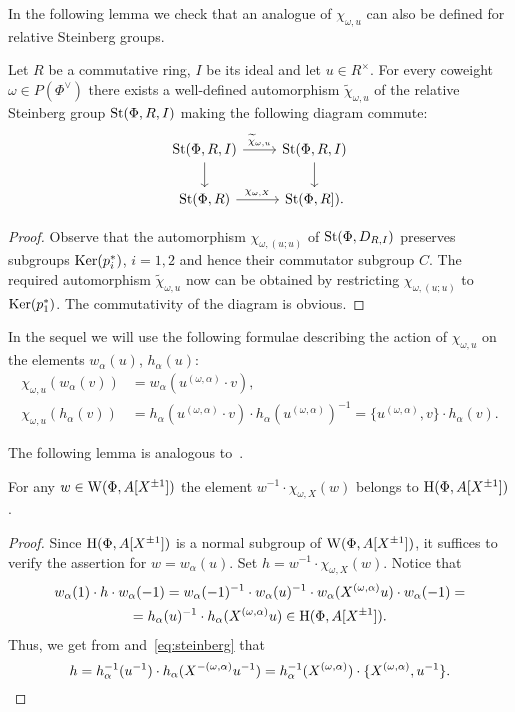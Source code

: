 In the following lemma we check that an analogue of $\chi_{\omega, u}$ can also be defined for relative Steinberg groups.
\begin{lemma} \label{lem:relative-chi}
Let $R$ be a commutative ring, $I$ be its ideal and let $u \in R^\times$.
For every coweight $\omega \in P(\Phi^\vee)$ there exists a well-defined automorphism $\widetilde{\chi}_{\omega, u}$ of the relative Steinberg group $\operatorname{St}(\Phi, R, I)$ making the following diagram commute:
\[\begin{tikzcd} \St(\Phi, R, I) \ar[r, "\widetilde{\chi}_{\omega, u}"] \ar[d] & \St(\Phi, R, I) \ar[d] \\
                 \St(\Phi, R) \ar[r, "\chi_{\omega, X}"] & \St(\Phi, R]). \end{tikzcd}\]
\end{lemma}
\begin{proof}
    Observe that the automorphism $\chi_{\omega, (u; u)}$ of $\operatorname{St}(\Phi, D_{R, I})$ preserves subgroups
     $\operatorname{Ker}(p_i^*)$, $i=1, 2$ and hence their commutator subgroup $C$.
    The required automorphism $\widetilde{\chi}_{\omega, u}$ now can be obtained by restricting $\chi_{\omega, (u; u)}$ to $\operatorname{Ker}(p_1^*)$.
    The commutativity of the diagram is obvious.
\end{proof}

In the sequel we will use the following formulae describing the action of $\chi_{\omega, u}$ on the elements $w_\alpha(u)$, $h_\alpha(u)$:
\begin{align}
    \label{eq:chi-w} \chi_{\omega, u}\left(w_\alpha(v)\right) &= w_\alpha(u^{(\omega, \alpha)} \cdot v), \\
    \label{eq:chi-h} \chi_{\omega, u} (h_\alpha(v)) &= h_\alpha(u^{(\omega, \alpha)} \cdot v) \cdot h_\alpha(u^{(\omega, \alpha)})^{-1} = \{u^{(\omega, \alpha)}, v\} \cdot h_\alpha(v).
\end{align}

The following lemma is analogous to~\cite[Lemma~3.1(c)]{Tu83}.
\begin{lemma} \label{lem:winv-chiw}
For any $w \in \operatorname{W}(\Phi, A[X^{\pm 1}])$ the element $w^{-1} \cdot \chi_{\omega, X}(w)$ belongs to $\operatorname{H}(\Phi, A[X^{\pm 1}])$.
\end{lemma}
\begin{proof}
Since $\operatorname{H}(\Phi, A[X^{\pm 1}])$ is a normal subgroup of $\operatorname{W}(\Phi, A[X^{\pm 1}])$, it suffices to verify the assertion for $w = w_\alpha(u)$.
Set $h = w^{-1} \cdot \chi_{\omega, X}(w)$.
Notice that
\begin{multline*} w_\alpha(1) \cdot h\cdot  w_\alpha(-1) = w_\alpha(-1)^{-1} \cdot w_\alpha(u)^{-1} \cdot w_{\alpha}(X^{(\omega, \alpha)} u) \cdot w_\alpha(-1) = \\
= h_\alpha(u)^{-1} \cdot h_\alpha(X^{(\omega, \alpha)}u) \in \operatorname{H}(\Phi, A[X^{\pm 1}]).\end{multline*}
Thus, we get from\cite[Lemme~5.2(b,g)]{Ma69} and~\eqref{eq:steinberg} that \[h = h_{\alpha}^{-1}(u^{-1}) \cdot h_{\alpha}(X^{-(\omega, \alpha)}u^{-1}) = h_{\alpha}^{-1}(X^{(\omega, \alpha)}) \cdot \{ X^{(\omega, \alpha)}, u^{-1} \}. \qedhere\]
\end{proof}

